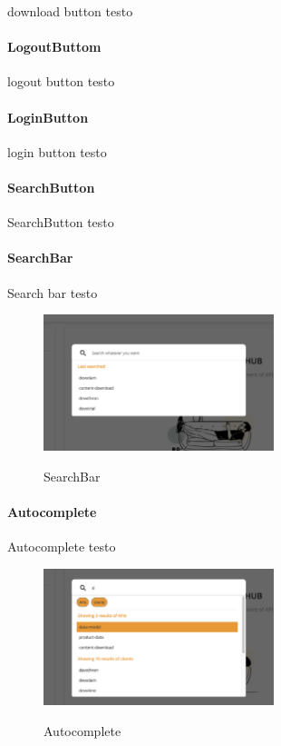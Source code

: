 download button testo

\paragraph{LogoutButtom}\label{par:logout-button}

logout button testo

\paragraph{LoginButton}\label{par:login-button}

login button testo

\paragraph{SearchButton}\label{par:search-button}

SearchButton testo

\paragraph{SearchBar}\label{par:search-bar}

Search bar testo

\begin{figure}[ht]
  \centering
  \includegraphics[width=0.6\textwidth, alt={Barra di ricerca globale dell'applicazione}]{images/frontend/SearchBar.jpg}
  \caption{SearchBar}\label{fig:search-bar}
\end{figure}

\paragraph{Autocomplete}\label{par:autocomplete}

Autocomplete testo

\begin{figure}[ht]
  \centering
  \includegraphics[width=0.6\textwidth, alt={Componente che si occupa della lista dinamica di risultati}]{images/frontend/SearchBar2.jpg}
  \caption{Autocomplete}\label{fig:autocomplete}
\end{figure}

